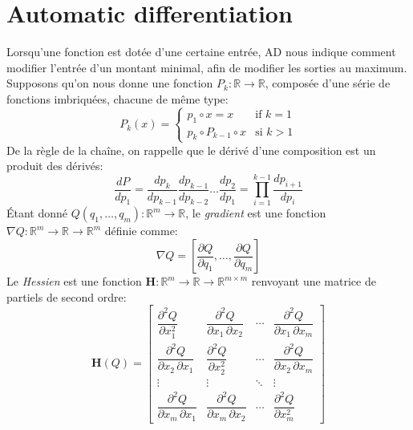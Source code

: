 \section{Automatic differentiation}\label{sec:automatic-differentiation}

Lorsqu'une fonction est dotée d'une certaine entrée, AD nous indique comment modifier l'entrée d'un montant minimal, afin de modifier les sorties au maximum. Supposons qu'on nous donne une fonction $P_k : \mathbb{R}\rightarrow\mathbb{R}$, composée d'une série de fonctions imbriquées, chacune de même type:
%
\begin{equation}
    P_k(x) = \begin{cases} p_1 \circ x = x &\text{if } k=1\\ p_k\circ P_{k-1} \circ x&\text{si } k > 1 \end{cases}
\end{equation}
%
De la règle de la chaîne, on rappelle que le dérivé d'une composition est un produit des dérivés:
%
\begin{equation} \label{eq:sfun_chain_rule}
\frac{dP}{dp_1} = \frac{dp_k}{dp_{k-1}}\frac{dp_{k-1}}{dp_{k-2}}\dots\frac{dp_2}{dp_1}= {\displaystyle \prod_{i=1}^{k-1} \frac{dp_{i+1}}{dp_{i}}}
\end{equation}
%
Étant donné $Q(q_1, \dots, q_m) : \mathbb{R}^m\rightarrow\mathbb{R}$, le \textit{gradient} est une fonction $\nabla Q : \mathbb{R}^m\rightarrow\mathbb{R}\rightarrow\mathbb{R}^m$ définie comme:
%
\begin{equation}
    \nabla Q = \left[ \frac{\partial Q}{\partial q_1}, \dots, \frac{\partial Q}{\partial q_m}\right]
\end{equation}
%
Le \textit{Hessien} est une fonction $\mathbf{H}:\mathbb{R}^m\rightarrow\mathbb{R}\rightarrow\mathbb{R}^{m\times m}$ renvoyant une matrice de partiels de second ordre:
%
\begin{equation}
    \mathbf{H}(Q) = \begin{bmatrix}{\dfrac {\partial ^{2}Q}{\partial x_{1}^{2}}}&{\dfrac {\partial ^{2}Q}{\partial x_{1}\,\partial x_{2}}}&\cdots &{\dfrac {\partial ^{2}Q}{\partial x_{1}\,\partial x_{m}}}\\[2.2ex]{\dfrac {\partial ^{2}Q}{\partial x_{2}\,\partial x_{1}}}&{\dfrac {\partial ^{2}Q}{\partial x_{2}^{2}}}&\cdots &{\dfrac {\partial ^{2}Q}{\partial x_{2}\,\partial x_{m}}}\\[2.2ex]\vdots &\vdots &\ddots &\vdots \\[2.2ex]{\dfrac {\partial ^{2}Q}{\partial x_{m}\,\partial x_{1}}}&{\dfrac {\partial ^{2}Q}{\partial x_{m}\,\partial x_{2}}}&\cdots &{\dfrac {\partial ^{2}Q}{\partial x_{m}^{2}}}\end{bmatrix}
\end{equation}
